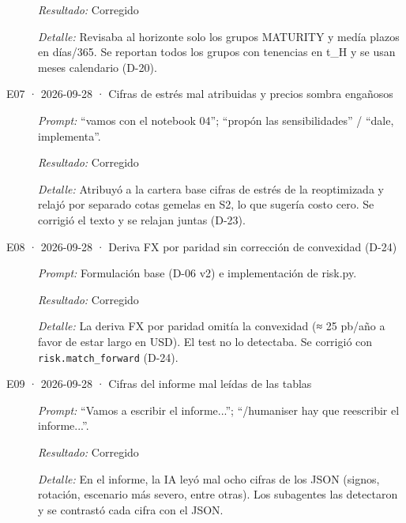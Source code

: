 \begin{description}
\textit{Resultado:} Corregido\par
\textit{Detalle:} Revisaba al horizonte solo los grupos MATURITY y medía plazos en días/365. Se reportan todos los grupos con tenencias en t\_H y se usan meses calendario (D-20).\par
\item[E07 · 2026-09-28 · Cifras de estrés mal atribuidas y precios sombra engañosos] \mbox{}\par
\textit{Prompt:} \enquote{vamos con el notebook 04}; \enquote{propón las sensibilidades} / \enquote{dale, implementa}.\par
\textit{Resultado:} Corregido\par
\textit{Detalle:} Atribuyó a la cartera base cifras de estrés de la reoptimizada y relajó por separado cotas gemelas en S2, lo que sugería costo cero. Se corrigió el texto y se relajan juntas (D-23).\par
\item[E08 · 2026-09-28 · Deriva FX por paridad sin corrección de convexidad (D-24)] \mbox{}\par
\textit{Prompt:} Formulación base (D-06 v2) e implementación de risk.py.\par
\textit{Resultado:} Corregido\par
\textit{Detalle:} La deriva FX por paridad omitía la convexidad (≈ 25 pb/año a favor de estar largo en USD). El test no lo detectaba. Se corrigió con \texttt{risk.match\_forward} (D-24).\par
\item[E09 · 2026-09-28 · Cifras del informe mal leídas de las tablas] \mbox{}\par
\textit{Prompt:} \enquote{Vamos a escribir el informe...}; \enquote{/humaniser hay que reescribir el informe...}.\par
\textit{Resultado:} Corregido\par
\textit{Detalle:} En el informe, la IA leyó mal ocho cifras de los JSON (signos, rotación, escenario más severo, entre otras). Los subagentes las detectaron y se contrastó cada cifra con el JSON.\par
\end{description}
